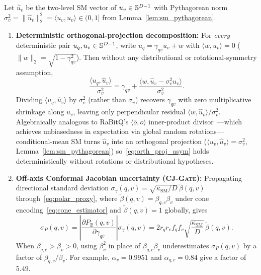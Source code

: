 \begin{proposition}
\label{prop:asym_cj_gate}
Let $\hat{u}_v$ be the two-level {SM} vector of $u_v \in \mathbb{S}^{D-1}$ with Pythagorean norm $\sigma_v^2 = \|\hat{u}_v\|_2^2 = \langle u_v, \hat{u}_v\rangle \in (0, 1]$ from Lemma~\ref{lem:sm_pythagorean}.
\begin{enumerate}
  \item \textbf{Deterministic orthogonal-projection decomposition:}
  For \emph{every} deterministic pair $u_q, u_v \in \mathbb{S}^{D-1}$, write $u_q = \gamma_{qv} u_v + w$ with $\langle w, u_v\rangle = 0$ ($\|w\|_2 = \sqrt{1 - \gamma_{qv}^2}$). Then without any distributional or rotational-symmetry assumption,
  \begin{equation}
    \frac{\langle u_q, \hat{u}_v\rangle}{\sigma_v^2}
    = \gamma_{qv} + \frac{\langle w, \hat{u}_v - \sigma_v^2 u_v\rangle}{\sigma_v^2}.
    \label{eq:orth_proj_asym}
  \end{equation}
  Dividing $\langle u_q, \hat{u}_v\rangle$ by $\sigma_v^2$ (rather than $\sigma_v$) recovers $\gamma_{qv}$ with zero multiplicative shrinkage along $u_v$, leaving only perpendicular residual $\langle w, \hat{u}_v\rangle / \sigma_v^2$.
  Algebraically analogous to {RaBitQ}'s $\langle \bar{o}, o\rangle$ inner-product divisor~\cite{gao2024rabitq}---which achieves unbiasedness in expectation via global random rotations---conditional-mean {SM} turns $\hat{u}_v$ into an orthogonal projection ($\langle u_v, \hat{u}_v\rangle = \sigma_v^2$, Lemma~\ref{lem:sm_pythagorean}) so~\eqref{eq:orth_proj_asym} holds deterministically without rotations or distributional hypotheses.

  \item \textbf{Off-axis Conformal Jacobian uncertainty (\textsc{CJ-Gate}):}
  Propagating directional standard deviation $\sigma_\gamma(q, v) = \sqrt{\kappa_{\mathrm{SM}}/D}\,\tilde{\beta}(q, v)$ through~\eqref{eq:polar_proxy}, where $\tilde{\beta}(q, v) = \beta_{q,c}\beta_v$ under cone encoding~\eqref{eq:cone_estimator} and $\tilde{\beta}(q, v) = 1$ globally, gives
  \begin{equation}
    \sigma_P(q, v) = \left|\frac{\partial P_{\mathbb{B}}(q, v)}{\partial \gamma_{qv}}\right|\sigma_\gamma(q, v)
    = 2 r_q r_v f_q f_v \sqrt{\frac{\kappa_{\mathrm{SM}}}{D}}\,\tilde{\beta}(q, v).
    \label{eq:cj_sigma}
  \end{equation}
  When $\beta_{q,c}>\beta_v>0$, using $\beta_v^2$ in place of $\beta_{q,c}\beta_v$ underestimates $\sigma_P(q,v)$ by a factor of $\beta_{q,c}/\beta_v$. For example, $\alpha_v=0.9951$ and $\alpha_{q,c}=0.84$ give a factor of $5.49$.


\end{enumerate}
\end{proposition}
